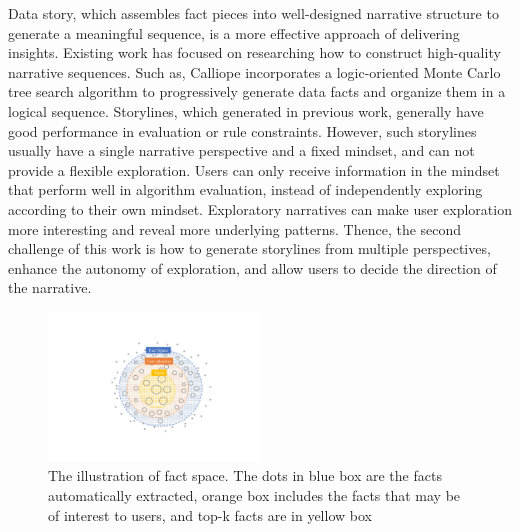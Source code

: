Data story, which assembles fact pieces into well-designed narrative structure to generate a meaningful sequence, is a more effective approach of delivering insights. 
Existing work has focused on researching how to construct high-quality narrative sequences. Such as,
Calliope incorporates a logic-oriented Monte Carlo tree search algorithm to progressively generate data facts and organize them in a logical sequence. 
Storylines, which generated in previous work, generally have good performance in evaluation or rule constraints. However, such storylines usually have a single narrative perspective and a fixed mindset, and can not provide a flexible exploration. 
Users can only receive information in the mindset that perform well in algorithm evaluation, instead of independently exploring according to their own mindset. 
Exploratory narratives can make user exploration more interesting and reveal more underlying patterns. 
Thence, the second challenge of this work is how to generate storylines from multiple perspectives, enhance the autonomy of exploration, and allow users to decide the direction of the narrative.
\begin{figure}[t]
	\centering
	\includegraphics[width=0.5\textwidth]{figures/introduction.pdf}
	\caption{The illustration of fact space. The dots in blue box are the facts automatically extracted, orange box includes the facts that may be of interest to users, and top-k facts are in yellow box }
	\label{factspace}
\end{figure}

